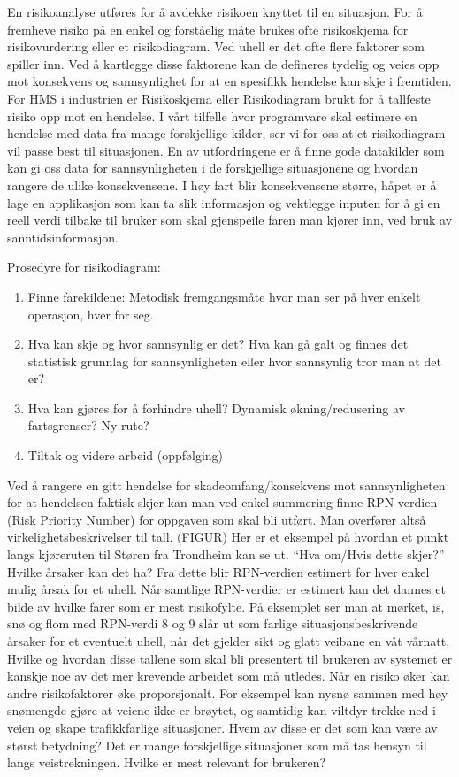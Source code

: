 \documentclass[a4paper,norsk,oneside]{book}
\begin{document}
En risikoanalyse utføres for å avdekke risikoen knyttet til en situasjon. For å fremheve risiko på en enkel og forståelig måte brukes ofte risikoskjema for risikovurdering eller et risikodiagram. Ved uhell er det ofte flere faktorer som spiller inn. Ved å kartlegge disse faktorene kan de defineres tydelig og veies opp mot konsekvens og sannsynlighet for at en spesifikk hendelse kan skje i fremtiden. For HMS i industrien er Risikoskjema eller Risikodiagram brukt for å tallfeste risiko opp mot en hendelse. I vårt tilfelle hvor programvare skal estimere en hendelse med data fra mange forskjellige kilder, ser vi for oss at et risikodiagram vil passe best til situasjonen. En av utfordringene er å finne gode datakilder som kan gi oss data for sannsynligheten i de forskjellige situasjonene og hvordan rangere de ulike konsekvensene. I høy fart blir konsekvensene større, håpet er å lage en applikasjon som kan ta slik informasjon og vektlegge inputen for å gi en reell verdi tilbake til bruker som skal gjenspeile faren man kjører inn, ved bruk av sanntidsinformasjon.

Prosedyre for risikodiagram:
\begin{enumerate}
\item Finne farekildene: Metodisk fremgangsmåte hvor man ser på hver enkelt operasjon, hver for seg.
\item Hva kan skje og hvor sannsynlig er det? Hva kan gå galt og finnes det statistisk grunnlag for sannsynligheten eller hvor sannsynlig tror man at det er?
\item Hva kan gjøres for å forhindre uhell? Dynamisk økning/redusering av fartsgrenser? Ny rute?
\item Tiltak og videre arbeid (oppfølging)
\end{enumerate}

Ved å rangere en gitt hendelse for skadeomfang/konsekvens mot sannsynligheten for at hendelsen faktisk skjer kan man ved enkel summering finne RPN-verdien (Risk Priority Number) for oppgaven som skal bli utført. Man overfører altså virkelighetsbeskrivelser til tall.  
(FIGUR)
Her er et eksempel på hvordan et punkt langs kjøreruten til Støren fra Trondheim kan se ut. “Hva om/Hvis dette skjer?” Hvilke årsaker kan det ha? Fra dette blir RPN-verdien estimert for hver enkel mulig årsak for et uhell. Når samtlige RPN-verdier er estimert kan det dannes et bilde av hvilke farer som er mest risikofylte. På eksemplet ser man at mørket, is, snø og flom med RPN-verdi 8 og 9 slår ut som farlige situasjonsbeskrivende årsaker for et eventuelt uhell, når det gjelder sikt og glatt veibane en våt vårnatt.
Hvilke og hvordan disse tallene som skal bli presentert til brukeren av systemet er kanskje noe av det mer krevende arbeidet som må utledes. Når en risiko øker kan andre risikofaktorer øke proporsjonalt. For eksempel kan nysnø sammen med høy snømengde gjøre at veiene ikke er brøytet, og samtidig kan viltdyr trekke ned i veien og skape trafikkfarlige situasjoner. Hvem av disse er det som kan være av størst betydning? Det er mange forskjellige situasjoner som må tas hensyn til langs veistrekningen. Hvilke er mest relevant for brukeren?
\end{document}
